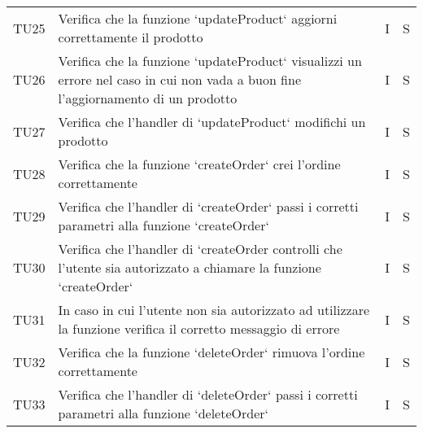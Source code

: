 \begin{center}
\begin{longtable}[!h]{p{45px} p{255px} p{35px} p{35px}}
        TU25          & Verifica che la funzione `updateProduct` aggiorni correttamente il prodotto                                                                                                                      & I              & S              \\
        TU26          & Verifica che la funzione `updateProduct` visualizzi un errore nel caso in cui non vada a buon fine l'aggiornamento di un prodotto                                                                & I              & S              \\
        TU27          & Verifica che l'handler di `updateProduct` modifichi un prodotto                                                                                                                                  & I              & S              \\
        TU28          & Verifica che la funzione `createOrder` crei l'ordine correttamente                                                                                                                               & I              & S              \\
        TU29          & Verifica che l'handler di `createOrder` passi i corretti parametri alla funzione `createOrder`                                                                                                   & I              & S              \\
        TU30          & Verifica che l'handler di `createOrder controlli che l'utente sia autorizzato a chiamare la funzione `createOrder`                                                                               & I              & S              \\
        TU31          & In caso in cui l'utente non sia autorizzato ad utilizzare la funzione verifica il corretto messaggio di errore                                                                                   & I              & S              \\
        TU32          & Verifica che la funzione `deleteOrder` rimuova l'ordine correttamente                                                                                                                            & I              & S              \\
        TU33          & Verifica che l'handler di `deleteOrder` passi i corretti parametri alla funzione `deleteOrder`                                                                                                   & I              & S              \\

\end{longtable}
\end{center}
